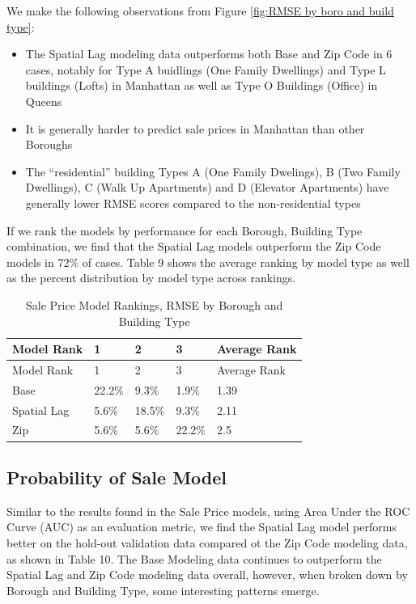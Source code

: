 \documentclass[]{article}
\providecommand{\tightlist}{%
  \setlength{\itemsep}{0pt}\setlength{\parskip}{0pt}}
\begin{document}
We make the following observations from Figure
\ref{fig:RMSE by boro and build type}:

\begin{itemize}
\tightlist
\item
  The Spatial Lag modeling data outperforms both Base and Zip Code in 6
  cases, notably for Type A buidlings (One Family Dwellings) and Type L
  buildings (Lofts) in Manhattan as well as Type O Buildings (Office) in
  Queens
\item
  It is generally harder to predict sale prices in Manhattan than other
  Boroughs
\item
  The ``residential'' building Types A (One Family Dwelings), B (Two
  Family Dwellings), C (Walk Up Apartments) and D (Elevator Apartments)
  have generally lower RMSE scores compared to the non-residential types
\end{itemize}

If we rank the models by performance for each Borough, Building Type
combination, we find that the Spatial Lag models outperform the Zip Code
models in 72\% of cases. Table 9 shows the average ranking by model type
as well as the percent distribution by model type across rankings.

\begin{longtable}[]{@{}lllll@{}}
\caption{Sale Price Model Rankings, RMSE by Borough and Building
Type}\tabularnewline
\toprule
Model Rank & 1 & 2 & 3 & Average Rank\tabularnewline
\midrule
\endfirsthead
\toprule
Model Rank & 1 & 2 & 3 & Average Rank\tabularnewline
\midrule
\endhead
Base & 22.2\% & 9.3\% & 1.9\% & 1.39\tabularnewline
Spatial Lag & 5.6\% & 18.5\% & 9.3\% & 2.11\tabularnewline
Zip & 5.6\% & 5.6\% & 22.2\% & 2.5\tabularnewline
\bottomrule
\end{longtable}

\subsection{Probability of Sale Model}\label{probability-of-sale-model}

Similar to the results found in the Sale Price models, using Area Under
the ROC Curve (AUC) as an evaluation metric, we find the Spatial Lag
model performs better on the hold-out validation data compared ot the
Zip Code modeling data, as shown in Table 10. The Base Modeling data
continues to outperform the Spatial Lag and Zip Code modeling data
overall, however, when broken down by Borough and Building Type, some
interesting patterns emerge.
\end{document}
